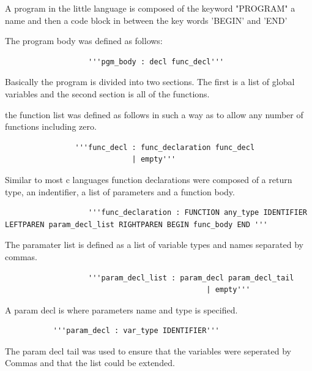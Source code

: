 \documentclass[12pt]{article}
\begin{document}
           A program in the little language is composed of the keyword "PROGRAM" a name and then a code block in between the key words 'BEGIN' and 'END'
           
           The program body was defined as follows:
           \begin{verbatim}
                   '''pgm_body : decl func_decl'''
           \end{verbatim}
           
           Basically the program is divided into two sections.  The first is a list of global variables and the second section is all of the functions.
           
           the function list was defined as follows in such a way as to allow any number of functions including zero.
           
           \begin{verbatim}
           		'''func_decl : func_declaration func_decl
               	             | empty'''
            \end{verbatim}
            
            Similar to most c languages function declarations were composed of a return type, an indentifier, a list of parameters and a function body.
            
            \begin{verbatim}
                   '''func_declaration : FUNCTION any_type IDENTIFIER LEFTPAREN param_decl_list RIGHTPAREN BEGIN func_body END '''
           \end{verbatim}
           
           The paramater list is defined as a list of variable types and names separated by commas.
           
            \begin{verbatim}
                   '''param_decl_list : param_decl param_decl_tail
                                              | empty'''
           \end{verbatim}
           
			A param decl is where parameters name and type is specified.
			
			\begin{verbatim}
           '''param_decl : var_type IDENTIFIER'''
           \end{verbatim}
			            
           The param decl tail was used to ensure that the variables were seperated by Commas and that the list could be extended.
           
\end{document}
